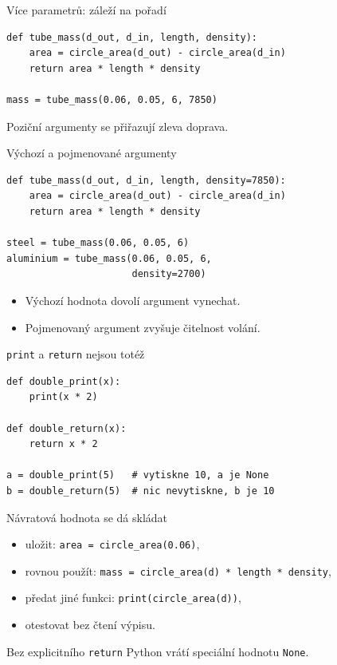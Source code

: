 \documentclass[aspectratio=169]{beamer}
\begin{document}
\begin{frame}[fragile]{Více parametrů: záleží na pořadí}
\begin{lstlisting}[style=python]
def tube_mass(d_out, d_in, length, density):
    area = circle_area(d_out) - circle_area(d_in)
    return area * length * density

mass = tube_mass(0.06, 0.05, 6, 7850)
\end{lstlisting}
  Poziční argumenty se přiřazují zleva doprava.
\end{frame}

\begin{frame}[fragile]{Výchozí a pojmenované argumenty}
\begin{lstlisting}[style=python]
def tube_mass(d_out, d_in, length, density=7850):
    area = circle_area(d_out) - circle_area(d_in)
    return area * length * density

steel = tube_mass(0.06, 0.05, 6)
aluminium = tube_mass(0.06, 0.05, 6,
                      density=2700)
\end{lstlisting}
  \begin{itemize}
    \item Výchozí hodnota dovolí argument vynechat.
    \item Pojmenovaný argument zvyšuje čitelnost volání.
  \end{itemize}
\end{frame}

\begin{frame}[fragile]{\texttt{print} a \texttt{return} nejsou totéž}
\begin{lstlisting}[style=python]
def double_print(x):
    print(x * 2)

def double_return(x):
    return x * 2

a = double_print(5)   # vytiskne 10, a je None
b = double_return(5)  # nic nevytiskne, b je 10
\end{lstlisting}
\end{frame}

\begin{frame}{Návratová hodnota se dá skládat}
  \begin{itemize}
    \item uložit: \texttt{area = circle\_area(0.06)},
    \item rovnou použít: \texttt{mass = circle\_area(d) * length * density},
    \item předat jiné funkci: \texttt{print(circle\_area(d))},
    \item otestovat bez čtení výpisu.
  \end{itemize}
  \begin{alertblock}{Bez explicitního \texttt{return}}
    Python vrátí speciální hodnotu \texttt{None}.
  \end{alertblock}
\end{frame}
\end{document}
